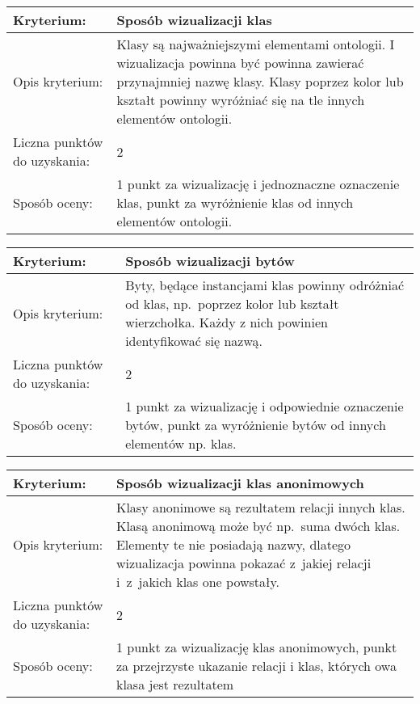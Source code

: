 \begin{longtable}{|m{3cm}|m{10cm}|}\hline
Kryterium:                   &  \bf{Sposób wizualizacji klas}\\ \hline
Opis kryterium:              & Klasy są najważniejszymi elementami ontologii. I wizualizacja powinna być powinna zawierać przynajmniej nazwę klasy. 
                               Klasy poprzez kolor lub kształt powinny wyróżniać się na tle innych elementów ontologii.\\ \hline
Liczna punktów do uzyskania: & 2 \\ \hline
Sposób oceny:                &  1 punkt za wizualizację i jednoznaczne oznaczenie klas, \newline
                                1 punkt za wyróżnienie klas od innych elementów ontologii.\\ \hline

\end{longtable}



\begin{longtable}{|m{3cm}|m{10cm}|}\hline
Kryterium:                   & \bf{Sposób wizualizacji bytów}\\ \hline
Opis kryterium:              & Byty, będące instancjami klas powinny odróżniać od klas, np.~poprzez kolor lub kształt wierzchołka. 
                               Każdy z nich powinien identyfikować się nazwą.  \\ \hline
Liczna punktów do uzyskania: & 2\\ \hline
Sposób oceny:                &  1 punkt za wizualizację i odpowiednie oznaczenie bytów,  \newline
                                1 punkt za wyróżnienie bytów od innych elementów np. klas.\\ \hline

\end{longtable}




\begin{longtable}{|m{3cm}|m{10cm}|}\hline
Kryterium:                   & \bf{ Sposób wizualizacji klas anonimowych }\\ \hline
Opis kryterium:              &  Klasy anonimowe są rezultatem relacji innych klas. Klasą anonimową może być np.~suma dwóch klas. 
				Elementy te nie posiadają nazwy, dlatego wizualizacja powinna pokazać z~jakiej relacji i~z~jakich klas one powstały.     \\ \hline
Liczna punktów do uzyskania: &  2  \\ \hline
Sposób oceny:                &  1 punkt za wizualizację klas anonimowych,  \newline 
                                1 punkt za przejrzyste ukazanie relacji i
				klas, których owa klasa jest rezultatem
                                 \\ \hline
                               
\end{longtable}



